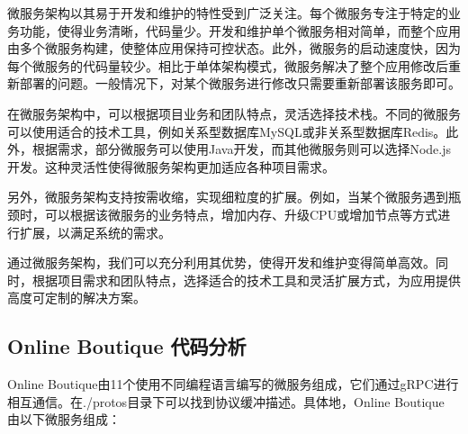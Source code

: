 微服务架构以其易于开发和维护的特性受到广泛关注。每个微服务专注于特定的业务功能，使得业务清晰，代码量少。开发和维护单个微服务相对简单，而整个应用由多个微服务构建，使整体应用保持可控状态。此外，微服务的启动速度快，因为每个微服务的代码量较少。相比于单体架构模式，微服务解决了整个应用修改后重新部署的问题。一般情况下，对某个微服务进行修改只需要重新部署该服务即可。

在微服务架构中，可以根据项目业务和团队特点，灵活选择技术栈。不同的微服务可以使用适合的技术工具，例如关系型数据库MySQL或非关系型数据库Redis。此外，根据需求，部分微服务可以使用Java开发，而其他微服务则可以选择Node.js开发。这种灵活性使得微服务架构更加适应各种项目需求。

另外，微服务架构支持按需收缩，实现细粒度的扩展。例如，当某个微服务遇到瓶颈时，可以根据该微服务的业务特点，增加内存、升级CPU或增加节点等方式进行扩展，以满足系统的需求。

通过微服务架构，我们可以充分利用其优势，使得开发和维护变得简单高效。同时，根据项目需求和团队特点，选择适合的技术工具和灵活扩展方式，为应用提供高度可定制的解决方案。

\subsection{Online Boutique 代码分析}
Online Boutique由11个使用不同编程语言编写的微服务组成，它们通过gRPC进行相互通信。在./protos目录下可以找到协议缓冲描述。具体地，Online Boutique 由以下微服务组成：

